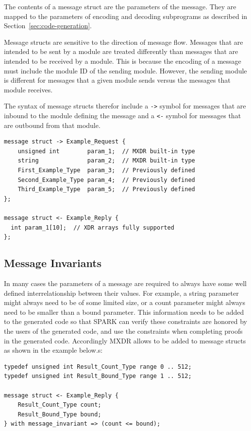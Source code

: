 The contents of a message struct are the parameters of the message. They are mapped to the
parameters of encoding and decoding subprograms as described in
Section~\ref{sec:code-generation}.

Message structs are sensitive to the direction of message flow. Messages that are intended to be
sent by a module are treated differently than messages that are intended to be received by a
module. This is because the encoding of a message must include the module ID of the sending
module. However, the sending module is different for messages that a given module sends versus
the messages that module receives.

The syntax of message structs therefor include a \texttt{->} symbol for messages that are
inbound to the module defining the message and a \texttt{<-} symbol for messages that are
outbound from that module.

\begin{Verbatim}
message struct -> Example_Request {
    unsigned int        param_1;  // MXDR built-in type
    string              param_2;  // MXDR built-in type
    First_Example_Type  param_3;  // Previously defined
    Second_Example_Type param_4;  // Previously defined
    Third_Example_Type  param_5;  // Previously defined
};

message struct <- Example_Reply {
  int param_1[10];  // XDR arrays fully supported
};
\end{Verbatim}

\subsection{Message Invariants}

In many cases the parameters of a message are required to always have some well defined
interrelationship between their values. For example, a string parameter might always need to be
of some limited size, or a count parameter might always need to be smaller than a bound
parameter. This information needs to be added to the generated code so that SPARK can verify
these constraints are honored by the users of the generated code, and use the constraints when
completing proofs in the generated code. Accordingly MXDR allows  to
be added to message structs as shown in the example below.s:

\begin{Verbatim}
typedef unsigned int Result_Count_Type range 0 .. 512;
typedef unsigned int Result_Bound_Type range 1 .. 512;

message struct <- Example_Reply {
    Result_Count_Type count;
    Result_Bound_Type bound;
} with message_invariant => (count <= bound);
\end{Verbatim}

